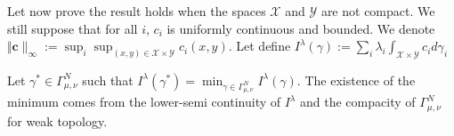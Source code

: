 \begin{prv*}

\medskip

Let now prove  the result holds when the spaces $\mathcal{X}$ and $\mathcal{Y}$ are not compact. We still suppose that for all $i$, $c_i$ is uniformly continuous and bounded. We denote $\Vert\mathbf{c}\rVert_\infty := \sup_i \sup_{(x,y)\in\mathcal{X}\times\mathcal{Y}} c_i(x,y)$.  Let define $I^\lambda(\gamma):=\sum_i\lambda_i\int_{\mathcal{X}\times\mathcal{Y}}c_id\gamma_i$

Let $\gamma^*\in \Gamma^N_{\mu,\nu}$ such that $I^\lambda(\gamma^*) =\min_{\gamma\in\Gamma^N_{\mu,\nu}}I^\lambda(\gamma)$.  The existence of the minimum comes from the lower-semi continuity of $I^\lambda$ and  the compacity of $\Gamma^N_{\mu,\nu}$ for weak topology.


\end{prv*}
